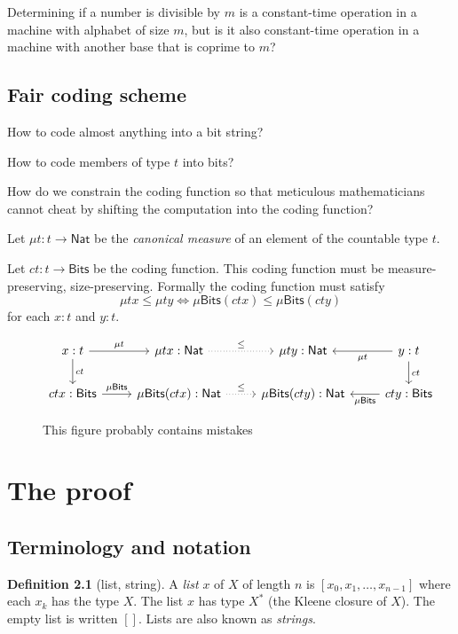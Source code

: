 \documentclass[10pt,statementpaper]{memoir}
\theoremstyle{definition}
\newcounter{thmctr}
\newtheorem{mdef}[thmctr]{Definition}
\newcommand\Bits{\mathsf{Bits}}
\newcommand\Nat{\mathsf{Nat}}
\begin{document}
Determining if a number is divisible by $m$ is a constant-time operation in a machine with alphabet of size $m$,
but is it also constant-time operation in a machine with another base that is coprime to $m$?

\section{Fair coding scheme}

How to code almost anything into a bit string?

How to code members of type $t$ into bits?

How do we constrain the coding function so that meticulous mathematicians
cannot cheat by shifting the computation into the coding function?

Let $\mu t : t \to \Nat$ be the \emph{canonical measure} of an element of the countable type $t$.

Let $c t : t \to \Bits$ be the coding function.
This coding function must be measure-preserving, size-preserving.
Formally the coding function must satisfy
\[
    \mu t x \le \mu t y \iff \mu \Bits (c t x) \le \mu \Bits (c t y)
\]
for each $x : t$ and $y : t$.

\begin{figure}[h]
    \[
        \begin{tikzcd}
            x : t \arrow[d, "c t"] \arrow[r, "\mu t"] & \mu t x : \Nat \arrow[r, dotted, "\le"] & \mu t y : \Nat & y : t \arrow[l, "\mu t"] \arrow[d, "c t"]
            \\
            c t x : \Bits \arrow[r, "\mu \Bits"] & \mu \Bits (c t x) : \Nat \arrow[r, dotted, "\le"] & \mu \Bits (c t y) : \Nat & c t y : \Bits \arrow[l, "\mu \Bits"]
        \end{tikzcd}
    \]
    \caption{This figure probably contains mistakes}
\end{figure}

\chapter{The proof}

\section{Terminology and notation}

\begin{mdef}[list, string]
    A \emph{list} $x$ of $X$ of length $n$ is $[x_0,x_1,\ldots,x_{n-1}]$
    where each $x_k$ has the type $X$.
    The list $x$ has type $X^*$ (the Kleene closure of $X$).
    The empty list is written $[]$.
    Lists are also known as \emph{strings}.
\end{mdef}
\end{document}
